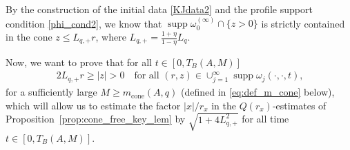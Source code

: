 \documentclass[reqno,11pt]{amsart}
\newcommand{\supp}{\operatorname{supp}}
\begin{document}
By the construction of the initial data \eqref{KJdata2} and the profile support condition \eqref{phi_cond2}, we know that $\supp \omega_0 ^{(\infty)}\cap \{z>0\}$ is strictly contained in the cone $z \le L_{q,+} r$, where $L_{q,+} = \frac{1+\eta}{1-\eta} L_q$.



Now, we want to prove that for all $t\in [0,T_B(A,M)]$ 
    \begin{align}
    \label{eq:cone_condition}
        2L_{q,+}r\geq |z|>0 
        \quad
        \text{for  all $(r,z)\in \cup_{j=1}^\infty \supp \omega_j(\cdot,\cdot,t)$,}
    \end{align}
for a sufficiently large $M\geq m_{\mathrm{cone}}(A,q)$ (defined in \eqref{eq:def_m_cone} below), which will allow us to 
estimate the factor $|x|/r_x$
in the $Q(r_x)$-estimates of Proposition~\ref{prop:cone_free_key_lem}
  by $\sqrt{1+4L_{q,+}^2}$   
for all time $t\in[0,T_B(A,M)]$.
\end{document}
